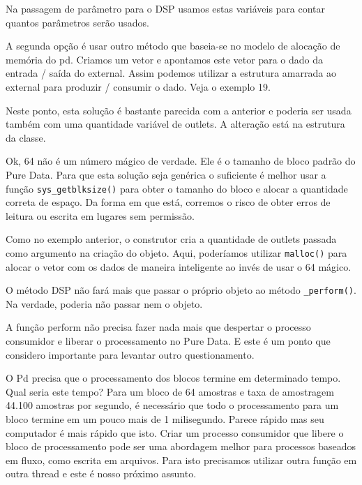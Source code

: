 

Na passagem de parâmetro para o DSP usamos estas variáveis para contar quantos
parâmetros serão usados.



A segunda opção é usar outro método que baseia-se no modelo de alocação de
memória do pd. Criamos um vetor e apontamos este vetor para o dado da entrada
/ saída do external. Assim podemos utilizar a estrutura amarrada ao external
para produzir / consumir o dado. Veja o exemplo 19.



Neste ponto, esta solução é bastante parecida com a anterior e poderia ser usada também com uma quantidade
variável de outlets. A alteração está na estrutura da classe.



Ok, 64 não é um número mágico de verdade. Ele é o tamanho de bloco padrão do
Pure Data. Para que esta solução seja genérica o suficiente é melhor usar a
função \texttt{sys\_getblksize()} para obter o tamanho do bloco e alocar
a quantidade correta de espaço. Da forma em que está, corremos o risco de
obter erros de leitura ou escrita em lugares sem permissão. 



Como no exemplo anterior, o construtor cria a quantidade de outlets passada
como argumento na criação do objeto. Aqui, poderíamos utilizar
\texttt{malloc()} para alocar o vetor com os dados de maneira inteligente ao
invés de usar o 64 mágico.



O método DSP não fará mais que passar o próprio objeto ao método
\texttt{\_perform()}. Na verdade, poderia não passar nem o objeto.



A função perform não precisa fazer nada mais que despertar o processo
consumidor e liberar o processamento no Pure Data. E este é um ponto que
considero importante para levantar outro questionamento.

O Pd precisa que o processamento dos blocos termine em determinado tempo. Qual
seria este tempo? Para um bloco de 64 amostras e taxa de amostragem 44.100
amostras por segundo, é necessário que todo o processamento para um bloco
termine em um pouco mais de 1 milisegundo. Parece rápido mas seu computador é
mais rápido que isto. Criar um processo consumidor que libere o bloco de 
processamento pode ser uma abordagem melhor para processos baseados em fluxo,
como escrita em arquivos. Para isto precisamos utilizar outra função em outra 
thread e este é nosso próximo assunto.

